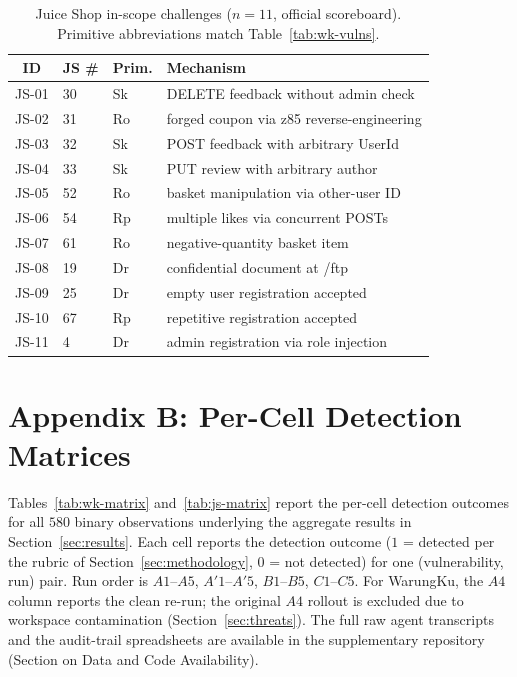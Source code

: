 \documentclass[conference]{IEEEtran}
\begin{document}
\begin{table}[h]
\centering
\caption{Juice Shop in-scope challenges ($n=11$, official scoreboard). Primitive abbreviations match Table~\ref{tab:wk-vulns}.}
\label{tab:js-vulns}
\footnotesize
\begin{tabular}{cllp{2.6cm}}
\toprule
\textbf{ID} & \textbf{JS \#} & \textbf{Prim.} & \textbf{Mechanism} \\
\midrule
JS-01 & 30 & Sk & DELETE feedback without admin check \\
JS-02 & 31 & Ro & forged coupon via z85 reverse-engineering \\
JS-03 & 32 & Sk & POST feedback with arbitrary UserId \\
JS-04 & 33 & Sk & PUT review with arbitrary author \\
JS-05 & 52 & Ro & basket manipulation via other-user ID \\
JS-06 & 54 & Rp & multiple likes via concurrent POSTs \\
JS-07 & 61 & Ro & negative-quantity basket item \\
JS-08 & 19 & Dr & confidential document at /ftp \\
JS-09 & 25 & Dr & empty user registration accepted \\
JS-10 & 67 & Rp & repetitive registration accepted \\
JS-11 & 4  & Dr & admin registration via role injection \\
\bottomrule
\end{tabular}
\end{table}

\section*{Appendix B: Per-Cell Detection Matrices}
\label{sec:appendix-matrix}

Tables~\ref{tab:wk-matrix} and~\ref{tab:js-matrix} report the per-cell detection outcomes for all $580$ binary observations underlying the aggregate results in Section~\ref{sec:results}. Each cell reports the detection outcome ($1$ = detected per the rubric of Section~\ref{sec:methodology}, $0$ = not detected) for one (vulnerability, run) pair. Run order is $A1$--$A5$, $A'1$--$A'5$, $B1$--$B5$, $C1$--$C5$. For WarungKu, the $A4$ column reports the clean re-run; the original $A4$ rollout is excluded due to workspace contamination (Section~\ref{sec:threats}). The full raw agent transcripts and the audit-trail spreadsheets are available in the supplementary repository (Section on Data and Code Availability).
\end{document}
